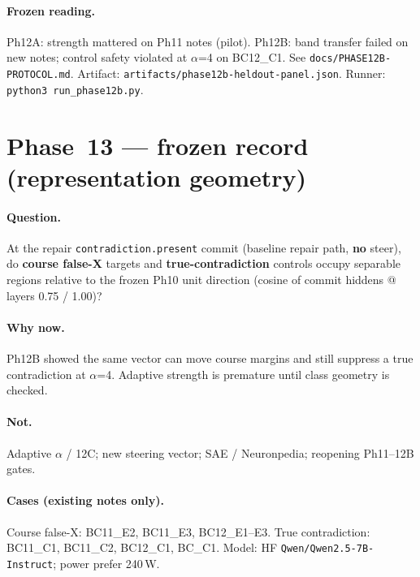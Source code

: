 \documentclass[11pt,a4paper]{article}
\begin{document}
\paragraph{Frozen reading.}
Ph12A: strength mattered on Ph11 notes (pilot).
Ph12B: band transfer failed on new notes; control safety violated at $\alpha$=4 on BC12\_C1.
See \texttt{docs/PHASE12B-PROTOCOL.md}. Artifact: \texttt{artifacts/phase12b-heldout-panel.json}.
Runner: \texttt{python3 run\_phase12b.py}.

\section{Phase~13 --- frozen record (representation geometry)}

\paragraph{Question.}
At the repair \texttt{contradiction.present} commit (baseline repair path, \textbf{no} steer), do \textbf{course false-X} targets and \textbf{true-contradiction} controls occupy separable regions relative to the frozen Ph10 unit direction (cosine of commit hiddens @ layers 0.75 / 1.00)?

\paragraph{Why now.}
Ph12B showed the same vector can move course margins and still suppress a true contradiction at $\alpha$=4. Adaptive strength is premature until class geometry is checked.

\paragraph{Not.}
Adaptive $\alpha$ / 12C; new steering vector; SAE / Neuronpedia; reopening Ph11--12B gates.

\paragraph{Cases (existing notes only).}
Course false-X: BC11\_E2, BC11\_E3, BC12\_E1--E3.
True contradiction: BC11\_C1, BC11\_C2, BC12\_C1, BC\_C1.
Model: HF \texttt{Qwen/Qwen2.5-7B-Instruct}; power prefer 240\,W.
\end{document}

